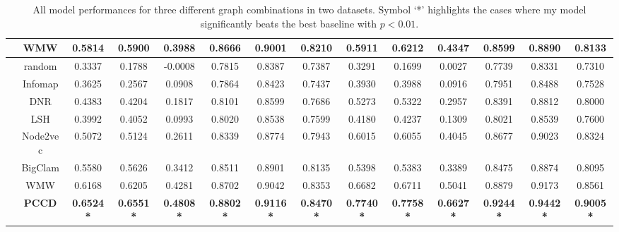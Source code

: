 \begin{table}
\begin{tabular}{|c|c|c|c|c|c|c|c|c|c|c|c|c|c|}
		& WMW &0.5814&0.5900&0.3988&0.8666&0.9001&0.8210&0.5911&0.6212&0.4347&0.8599&0.8890&0.8133
		\\   \hline
		 &random  & 0.3337& 0.1788&-0.0008&0.7815&0.8387&0.7387&0.3291&0.1699&0.0027&0.7739&0.8331&0.7310\\ 
		& Infomap &0.3625& 0.2567&0.0908&0.7864&0.8423&0.7437 &0.3930&0.3988&0.0916&0.7951&0.8488&0.7528\\  
		& DNR &0.4383&0.4204&0.1817&0.8101&0.8599&0.7686&0.5273&0.5322&0.2957&0.8391&0.8812&0.8000\\   
		& LSH &0.3992&0.4052&0.0993&0.8020&0.8538&0.7599&0.4180&0.4237&0.1309&0.8021&0.8539&0.7600\\ 
		& Node2vec& 0.5072  &0.5124&0.2611&0.8339&0.8774&0.7943&0.6015&0.6055&0.4045&0.8677&0.9023&0.8324\\   
		& BigClam &0.5580&0.5626&0.3412&0.8511&0.8901&0.8135&0.5398&0.5383&0.3389&0.8475&0.8874&0.8095\\ 
		& WMW &0.6168&0.6205&0.4281&0.8702&0.9042&0.8353&0.6682&0.6711&0.5041&0.8879&0.9173&0.8561\\ 
		& \textbf{PCCD}& \textbf{ 0.6524*}& \textbf{0.6551*} &  \textbf{0.4808*}& \textbf{0.8802*} & \textbf{0.9116*} & \textbf{0.8470*}& \textbf{0.7740*}& \textbf{0.7758*} &  \textbf{0.6627*}& \textbf{0.9244*} & \textbf{0.9442*} &  \textbf{0.9005*}
		\\ \hline
	\end{tabular}
	\caption{All model performances for three different graph combinations in two datasets. Symbol `*' highlights the cases where my model significantly beats the best baseline with $p<0.01$.}
	\label{tab:c4_evaluation}
\end{table}